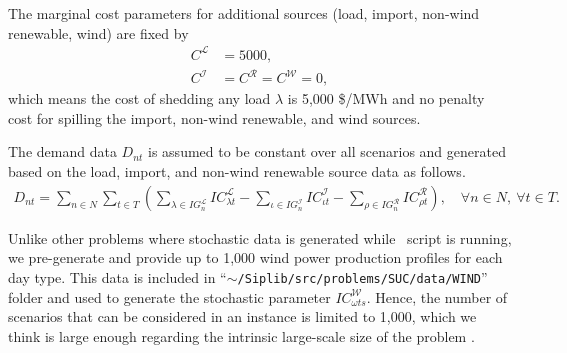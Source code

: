 The marginal cost parameters for additional sources (load, import, non-wind renewable, wind) are fixed by
\begin{align*}
C^\mathcal{L}&=5000,\\
C^\mathcal{I}&=C^\mathcal{R}=C^\mathcal{W}=0,
\end{align*}
which means the cost of shedding any load $\lambda$ is 5,000 \$/MWh and no penalty cost for spilling the import, non-wind renewable, and wind sources.

The demand data $D_{nt}$ is assumed to be constant over all scenarios and generated based on the load, import, and non-wind renewable source data as follows.
\begin{align*}
D_{nt}=\sum_{n\in N} \sum_{t\in T}\left(  \sum_{\lambda\in IG_n^\mathcal{L}}IC_{\lambda t}^\mathcal{L} - \sum_{\iota\in IG_n^\mathcal{I}}IC_{\iota t}^\mathcal{I} - \sum_{\rho\in IG_n^\mathcal{R}}IC_{\rho t}^\mathcal{R}    \right),\quad\forall n\in N,\ \forall t\in T.
\end{align*}

Unlike other problems where stochastic data is generated while \julia\ script is running, we pre-generate and provide up to 1,000 wind power production profiles for each day type. This data is included in ``\texttt{$\sim$/Siplib/src/problems/SUC/data/WIND}'' folder and used to generate the stochastic parameter $IC_{\omega ts}^\mathcal{W}$. Hence, the number of scenarios that can be considered in an instance is limited to 1,000, which we think is large enough regarding the intrinsic large-scale size of the problem \suc.

